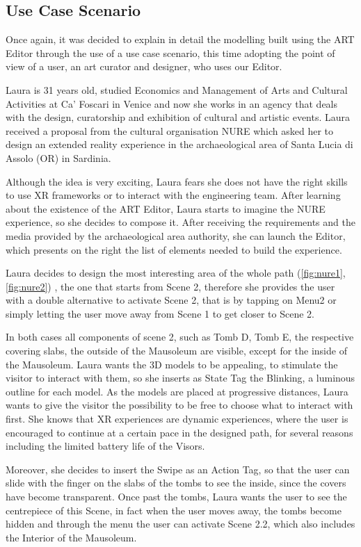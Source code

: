 \subsection*{Use Case Scenario}

Once again, it was decided to explain in detail the modelling built using the ART Editor through the use of a use case scenario, this time adopting the point of view of a user, an art curator and designer, who uses our Editor. 

Laura is 31 years old, studied Economics and Management of Arts and Cultural Activities at Ca' Foscari in Venice and now she works in an agency that deals with the design, curatorship and exhibition of cultural and artistic events. Laura received a proposal from the cultural organisation NURE which asked her to design an extended reality experience in the archaeological area of Santa Lucia di Assolo (OR) in Sardinia.

Although the idea is very exciting, Laura fears she does not have the right skills to use XR frameworks or to interact with the engineering team. After learning about the existence of the ART Editor, Laura starts to imagine the NURE experience, so she decides to compose it. After receiving the requirements and the media provided by the archaeological area authority, she can launch the Editor, which presents on the right the list of elements needed to build the experience. 

Laura decides to design the most interesting area of the whole path (\autoref{fig:nure1}, \autoref{fig:nure2}) , the one that starts from Scene 2, therefore she provides the user with a double alternative to activate Scene 2, that is by tapping on Menu2 or simply letting the user move away from Scene 1 to get closer to Scene 2.

In both cases all components of scene 2, such as Tomb D, Tomb E, the respective covering slabs, the outside of the Mausoleum are visible, except for the inside of the Mausoleum. Laura wants the 3D models to be appealing, to stimulate the visitor to interact with them, so she inserts as State Tag the Blinking, a luminous outline for each model. 
As the models are placed at progressive distances, Laura wants to give the visitor the possibility to be free to choose what to interact with first. She knows that XR experiences are dynamic experiences, where the user is encouraged to continue at a certain pace in the designed path, for several reasons including the limited battery life of the Visors. 

Moreover, she decides to insert the Swipe as an Action Tag, so that the user can slide with the finger on the slabs of the tombs to see the inside, since the covers have become transparent. Once past the tombs, Laura wants the user to see the centrepiece of this Scene, in fact when the user moves away, the tombs become hidden and through the menu the user can activate Scene 2.2, which also includes the Interior of the Mausoleum. 


